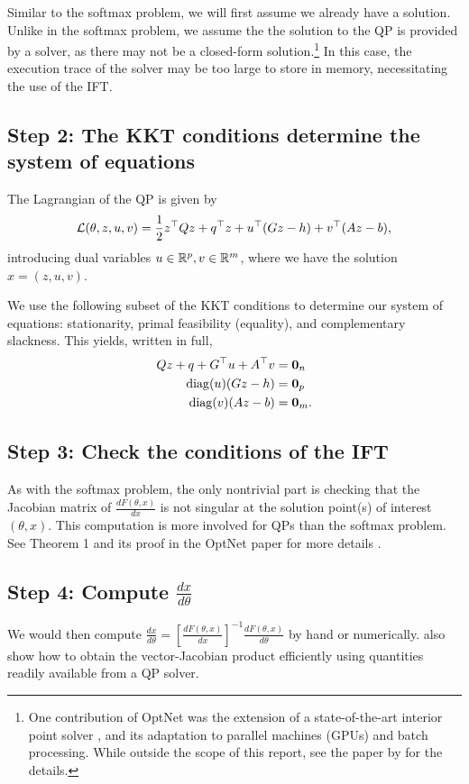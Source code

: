 \documentclass[11pt]{article}
\begin{document}
Similar to the softmax problem, we will first assume we already have a solution.
Unlike in the softmax problem, we assume the the solution to the QP is provided by a solver,
as there may not be a closed-form solution.\footnote{
One contribution of OptNet was the extension of a state-of-the-art interior point
solver \citep{optnet}, and its adaptation to parallel machines (GPUs) and batch processing.
While outside the scope of this report, see the paper by \citet{optnet} for the details.
}
In this case, the execution trace of the solver may be too large to store in memory,
necessitating the use of the IFT.

\subsection*{Step 2: The KKT conditions determine the system of equations}
The Lagrangian of the QP is given by
$$
\mathcal{L}(\theta,z,u,v) = \frac12 z^\top Qz + q^\top z + u^\top(Gz-h) + v^\top(Az-b),
$$
introducing dual variables $u\in\mathbb{R}^p,v\in\mathbb{R}^m$,
where we have the solution $x = (z,u,v)$.

We use the following subset of the KKT conditions to determine our system of equations:
stationarity, primal feasibility (equality), and complementary slackness.
This yields, written in full,
\begin{equation}
\begin{aligned}
Qz + q + G^\top u + A^\top v  &= \mathbf{0}_n\\
\mathrm{diag}(u)(Gz-h) &= \mathbf{0}_p\\
\mathrm{diag}(v)(Az-b) &= \mathbf{0}_m.
\end{aligned}
\end{equation}

\subsection*{Step 3: Check the conditions of the IFT}
As with the softmax problem,
the only nontrivial part is checking that the Jacobian matrix of $\frac{dF(\theta,x)}{dx}$ is
not singular at the solution point(s) of interest $(\theta,x)$.
This computation is more involved for QPs than the softmax problem. 
See Theorem 1 and its proof in the OptNet paper for more details \citep{optnet}.

\subsection*{Step 4: Compute $\frac{dx}{d\theta}$}
We would then compute
$\frac{dx}{d\theta} = \left[\frac{dF(\theta,x)}{dx}\right]^{-1}\frac{dF(\theta,x)}{d\theta}$
by hand or numerically.
\citet{optnet} also show how to obtain the vector-Jacobian product efficiently
using quantities readily available from a QP solver.
\end{document}
